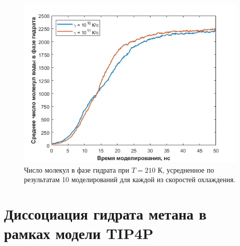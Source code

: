 \begin{figure}[H]
    \centering
    \includegraphics[width=.9\linewidth]{figures/bulk.png}
    \caption{Число молекул в фазе гидрата при $T=210$ К, усредненное по результатам 10 моделирований для каждой из скоростей охлаждения.}
    \label{fig3.8}
\end{figure}
\pagebreak

\section{Диссоциация гидрата метана в рамках модели TIP4P}